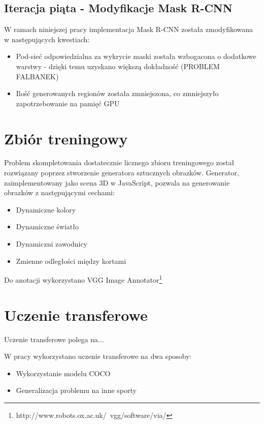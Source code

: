 \subsection{Iteracja piąta - Modyfikacje Mask R-CNN}

W ramach niniejszej pracy implementacja Mask R-CNN została zmodyfikowana w następujących kwestiach:

\begin{itemize}
	\item Pod-sieć odpowiedzialna za wykrycie maski została wzbogacona o dodatkowe warstwy - dzięki temu uzyskano większą dokładność (PROBLEM FALBANEK)
	\item Ilość generowanych regionów została zmniejszona, co zmniejszyło zapotrzebowanie na pamięć GPU
\end{itemize}

\section{Zbiór treningowy}

Problem skompletowania dostatecznie licznego zbioru treningowego został rozwiązany poprzez stworzenie generatora sztucznych obrazków. Generator, zaimplementowany jako scena 3D w JavaScript, pozwala na generowanie obrazków z następującymi cechami:

\begin{itemize}
	\item Dynamiczne kolory
	\item Dynamiczne światło
	\item Dynamiczni zawodnicy
	\item Zmienne odległości między kortami
\end{itemize}

Do anotacji wykorzystano VGG Image Annotator\footnote{http://www.robots.ox.ac.uk/~vgg/software/via/}

\section{Uczenie transferowe}

Uczenie transferowe polega na...

W pracy wykorzystano uczenie transferowe na dwa sposoby:

\begin{itemize}
	\item Wykorzystanie modelu COCO
	\item Generalizacja problemu na inne sporty
\end{itemize}

